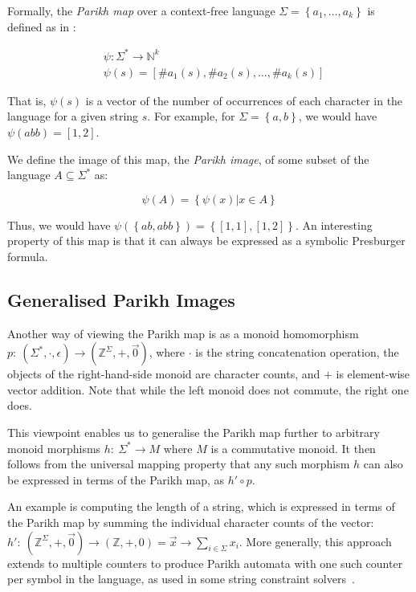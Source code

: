 \documentclass{easychair}
\begin{document}
Formally, the \textit{Parikh map} over a context-free language $\Sigma = \left\{a_1, \ldots, a_k \right\}$ is defined as in \cite{kozen}:

$$
\begin{aligned}
& \psi: \Sigma^* \rightarrow \mathbb{N}^k \\
& \psi(s) = \left[\#a_1(s), \#a_2(s), \ldots, \#a_k(s)\right]
\end{aligned}
$$

That is, $\psi(s)$ is a vector of the number of occurrences of each character in the language for a given string $s$. For example, for  $\Sigma = \left \{ a, b\right\}$, we would have $\psi(abb) = \left[1, 2\right]$.

We define the image of this map, the \textit{Parikh image}, of some subset of the language $A \subseteq \Sigma^*$ as:

$$
\psi(A) = \left\{ \psi(x) | x \in A \right\}
$$

Thus, we would have $\psi(\left\{ab, abb\right\}) = \left\{\left[1, 1\right], \left[1, 2\right]\right\}$. An interesting property of this map is that it can always be expressed as a symbolic Presburger formula.

\subsection{Generalised Parikh Images}\label{sec:generalised}

Another way of viewing the Parikh map is as a monoid homomorphism $p:\: \left(\Sigma^*, \cdot, \epsilon \right) \to (\mathbb{Z}^\Sigma, +, \vec{0})$, where $\cdot$ is the string concatenation operation, the objects of the right-hand-side monoid are character counts, and $+$ is element-wise vector addition. Note that while the left monoid does not commute, the right one does.

This viewpoint enables us to generalise the Parikh map further to arbitrary monoid morphisms $h:\: \Sigma^* \to M$ where $M$ is a commutative monoid. It then follows from the universal mapping property that any such morphism $h$ can also be expressed in terms of the Parikh map, as $h' \circ p$.

An example is computing the length of a string, which is expressed in terms of
the Parikh map by summing the individual character counts of the vector: $h':\:
(\mathbb{Z}^\Sigma, +, \vec{0}) \to (\mathbb{Z}, +, 0) = \vec{x} \to \sum_{i \in
\Sigma} x_i$. More generally, this approach extends to multiple counters to
produce Parikh automata with one such counter per symbol in the language, as
used in some string
constraint solvers~\cite{path-feasibility-strings}.
\end{document}
